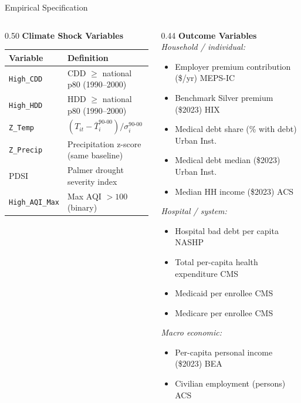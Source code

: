 \documentclass[aspectratio=169,11pt]{beamer}
\newcommand{\tealtext}[1]{{\color{Teal}#1}}
\newcommand{\graytext}[1]{{\color{WarmGray}#1}}
\begin{document}
\begin{frame}{Empirical Specification}
\begin{columns}[T]
\begin{column}{0.50\textwidth}
      \textbf{\tealtext{Climate Shock Variables}}\\[0.2em]
      \scriptsize
      \begin{tabular}{ll}
        \toprule
        Variable & Definition \\
        \midrule
        \texttt{High\_CDD} & CDD $\geq$ national p80 (1990--2000) \\
        \texttt{High\_HDD} & HDD $\geq$ national p80 (1990--2000) \\
        \texttt{Z\_Temp}   & $(T_{it} - \bar{T}_i^{90\text{-}00})/\sigma_i^{90\text{-}00}$ \\
        \texttt{Z\_Precip} & Precipitation z-score (same baseline) \\
        PDSI               & Palmer drought severity index \\
        \texttt{High\_AQI\_Max} & Max AQI $> 100$ (binary) \\
        \bottomrule
      \end{tabular}
    \end{column}
    \begin{column}{0.44\textwidth}
      \textbf{\tealtext{Outcome Variables}}\\[0.2em]
      \scriptsize
      \textit{Household / individual:}
      \begin{itemize}\itemsep0.03em
        \item Employer premium contribution (\$/yr) \graytext{MEPS-IC}
        \item Benchmark Silver premium (\$2023) \graytext{HIX}
        \item Medical debt share (\% with debt) \graytext{Urban Inst.}
        \item Medical debt median (\$2023) \graytext{Urban Inst.}
        \item Median HH income (\$2023) \graytext{ACS}
      \end{itemize}
      \vspace{0.12em}
      \textit{Hospital / system:}
      \begin{itemize}\itemsep0.03em
        \item Hospital bad debt per capita \graytext{NASHP}
        \item Total per-capita health expenditure \graytext{CMS}
        \item Medicaid per enrollee \graytext{CMS}
        \item Medicare per enrollee \graytext{CMS}
      \end{itemize}
      \vspace{0.12em}
      \textit{Macro economic:}
      \begin{itemize}\itemsep0.03em
        \item Per-capita personal income (\$2023) \graytext{BEA}
        \item Civilian employment (persons) \graytext{ACS}
      \end{itemize}
    \end{column}
  \end{columns}
\end{frame}
\end{document}
